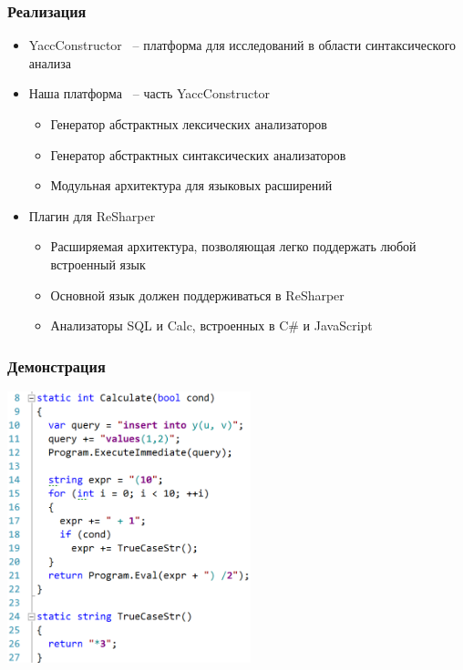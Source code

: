 \documentclass{beamer}
\begin{document}
\begin{frame}[fragile]
	\transwipe[direction=90]
	\frametitle{Реализация}

	\begin{itemize}
		\item YaccConstructor ~-- платформа для исследований в области синтаксического анализа
		\item Наша платформа ~-- часть YaccConstructor
			\begin{itemize}
				\item Генератор абстрактных лексических анализаторов
				\item Генератор абстрактных синтаксических анализаторов
				\item Модульная архитектура для языковых расширений
			\end{itemize}
		\item Плагин для ReSharper
			\begin{itemize}
				\item Расширяемая архитектура, позволяющая легко поддержать любой встроенный язык
				\item Основной язык должен поддерживаться в ReSharper
				\item Анализаторы SQL и Calc, встроенных в C\# и JavaScript
			\end{itemize}
	\end{itemize}
\end{frame}

\begin{frame}[fragile]
	\transwipe[direction=90]
	\frametitle{Демонстрация}
	\begin{center}
            \includegraphics[width=200pt]{pictures/sql_and_calc_cycle.PNG}
        \end{center}
\end{frame}
\end{document}
